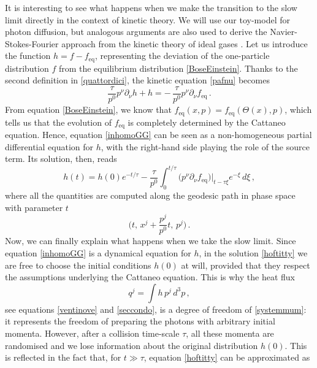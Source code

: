 \documentclass[a4paper, amsfonts, amssymb, amsmath, reprint, twocolumn, showkeys, nofootinbib]{revtex4-2}
\begin{document}
It is interesting to see  what happens when we make the transition to the slow limit directly in the context of kinetic theory. We will use our toy-model for photon diffusion, but analogous arguments are also used to derive the Navier-Stokes-Fourier approach from the kinetic theory of ideal gases \citep{huang_book,cercignani_book}. 
Let us introduce the function $ h =f-f_{\text{eq}} $, representing the deviation of the one-particle distribution $f$ from the equilibrium distribution \eqref{BoseEinstein}.
Thanks to  the second definition in \eqref{quattordici}, the kinetic equation \eqref{pafnu} becomes
\begin{equation}\label{inhomoGG}
\dfrac{\tau}{p^0} p^\nu \partial_\nu h + h = 
- \, \dfrac{\tau}{p^0} p^\nu \partial_\nu f_{\text{eq}} \, .
\end{equation}
From equation \eqref{BoseEinstein}, we know that $f_{\text{eq}}(x,p)=f_{\text{eq}}(\Theta(x),p)$, which tells us that the evolution of $f_{\text{eq}}$ is completely determined by the Cattaneo equation. Hence, equation \eqref{inhomoGG} can be seen as a non-homogeneous partial differential equation for $h$, with the right-hand side playing the role of the source term. 
Its solution, then, reads
\begin{equation}\label{hoftitty}
h(t) =h(0)e^{-t/\tau} - \dfrac{\tau}{p^0} \int_0^{t/\tau} \bigg( p^\nu \partial_\nu f_{\text{eq}} \bigg)\bigg|_{t-\tau \xi} e^{-\xi} \, d\xi \, ,
\end{equation}
where all the quantities are computed along the geodesic path in phase space \citep{MTW_book} with parameter $t$  
\begin{equation}\label{geoddetica}
\bigg(t, \, x^j+\dfrac{p^j}{p^0}t , \, p^j  \bigg) \, .
\end{equation}
Now, we can finally explain what happens when we take the slow limit.
Since equation \eqref{inhomoGG} is a dynamical equation for $h$, in the solution \eqref{hoftitty} we are free to choose the initial conditions $h(0)$ at will, provided that they respect the assumptions underlying the Cattaneo equation. 
This is why the heat flux
\begin{equation}\label{maqj}
q^j =\int h \, p^j \, d^3 p \, ,
\end{equation}
see equations \eqref{ventinove} and \eqref{seccondo}, is a degree of freedom of \eqref{systemmum}: it represents the freedom of preparing the photons with arbitrary initial momenta. However, after a collision time-scale $\tau$, all these momenta are randomised and we lose information about the original distribution $h(0)$. This is reflected in the fact that, for $t \gg \tau$, equation \eqref{hoftitty} can be approximated as
\end{document}
